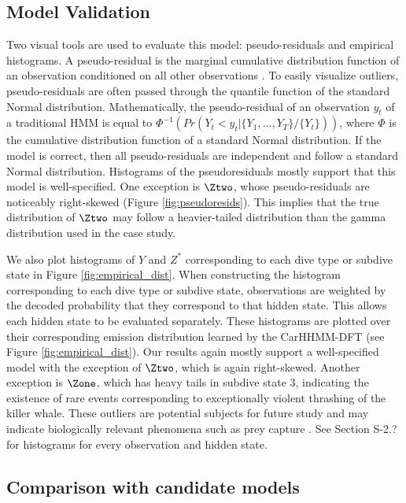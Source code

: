 \subsection{Model Validation}
\label{subsec:model_validation}

Two visual tools are used to evaluate this model: pseudo-residuals and empirical histograms. A pseudo-residual is the marginal cumulative distribution function of an observation conditioned on all other observations \citep{Zucchini:2016}. To easily visualize outliers, pseudo-residuals are often passed through the quantile function of the standard Normal distribution. Mathematically, the pseudo-residual of an observation $y_t$ of a traditional HMM is equal to $\Phi^{-1} \left(Pr(Y_t < y_t|\{Y_1,\ldots,Y_T\}/\{Y_t\}) \right)$, where $\Phi$ is the cumulative distribution function of a standard Normal distribution. If the model is correct, then all pseudo-residuals are independent and follow a standard Normal distribution. Histograms of the pseudoresiduals mostly support that this model is well-specified. One exception is $\Ztwo$, whose pseudo-residuals are noticeably right-skewed (Figure \ref{fig:pseudoresids}). This implies that the true distribution of $\Ztwo$ may follow a heavier-tailed distribution than the gamma distribution used in the case study. 

We also plot histograms of $Y$ and $Z^*$ corresponding to each dive type or subdive state in Figure \ref{fig:empirical_dist}. When constructing the histogram corresponding to each dive type or subdive state, observations are weighted by the decoded probability that they correspond to that hidden state. This allows each hidden state to be evaluated separately. These histograms are plotted over their corresponding emission distribution learned by the CarHHMM-DFT (see Figure \ref{fig:empirical_dist}). Our results again mostly support a well-specified model with the exception of $\Ztwo$, which is again right-skewed. Another exception is $\Zone$, which has heavy tails in subdive state 3, indicating the existence of rare events corresponding to exceptionally violent thrashing of the killer whale. These outliers are potential subjects for future study and may indicate biologically relevant phenomena such as prey capture \citep{Tennessen:2019a}. See Section S-2.? for histograms for every observation and hidden state. 

\subsection{Comparison with candidate models}

